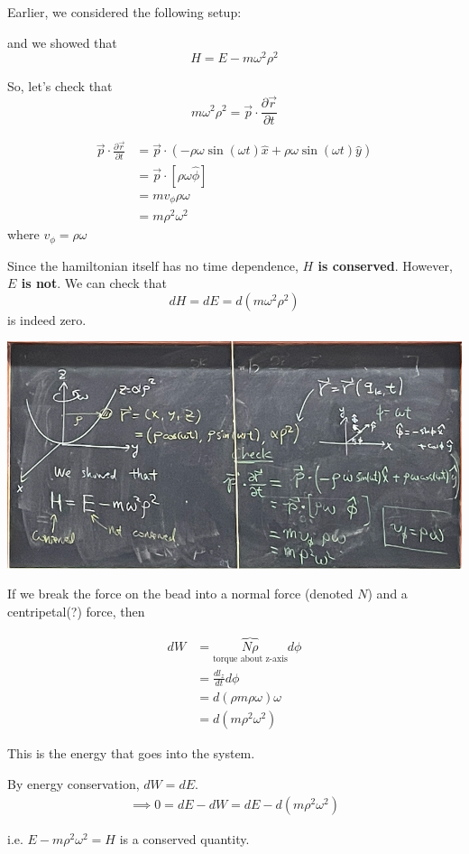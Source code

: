 \documentclass[11pt]{article}
\begin{document}
\vskip 0.5cm
Earlier, we considered the following setup:


\vskip 0.5cm
and we showed that 
\[ H = E - m\omega^2 \rho^2 \]

So, let's check that 
\[ m\omega^2 \rho^2 = \vec{p} \cdot \frac{\partial \vec{r}}{\partial t} \]

\begin{bluebox}
\begin{align*}
  \vec{p} \cdot \frac{\partial \vec{r}}{\partial t} &= \vec{p} \cdot \left( -\rho \omega \sin(\omega t) \hat{x} + \rho \omega \sin(\omega t) \hat{y} \right) \\
  &= \vec{p} \cdot \left[ \rho  \omega \hat{\phi} \right] \\
  &= m v_{\phi} \rho \omega \\
  &= m \rho^2 \omega^2 
\end{align*}
where $v_{\phi} = \rho \omega$
\end{bluebox}

Since the hamiltonian itself has no time dependence, \textbf{$H$ is conserved}. However, \textbf{$E$ is not}. We can check that 
\[ dH = dE = d(m \omega^2 \rho^2) \] is indeed zero. 

\vskip 0.5cm
\begin{center}
  \includegraphics[scale=0.6]{July 3/july 3 pic 1.png}
\end{center}

\vskip 0.5cm
\begin{bluebox}
  If we break the force on the bead into a normal force (denoted $N$) and a centripetal(?) force, then

\begin{align*}
  dW &= \overbrace{N \rho}_{\text{torque about z-axis}} d\phi \\
  &= \frac{d {l}_z}{dt} d\phi \\
  &= d \left(\rho m \rho \omega\right) \omega \\
  &= d\left(m \rho^2 \omega^2\right)
\end{align*}

This is the energy that goes into the system.

\vskip 0.5cm
By energy conservation, $dW = dE$.
\begin{align*}
  \implies 0 = dE - dW = dE - d(m\rho^2 \omega^2)
\end{align*}

i.e. $E - m\rho^2 \omega^2 = H$ is a conserved quantity.
\end{bluebox}
\end{document}
